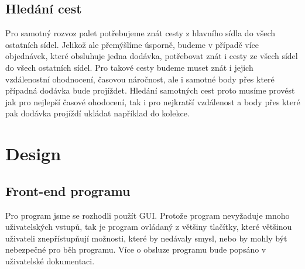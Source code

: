 \documentclass[ 12pt, a4paper]{article}
\begin{document}
\subsection{Hledání cest}
Pro samotný rozvoz palet potřebujeme znát cesty z hlavního sídla do všech ostatních sídel. 
Jelikož ale přemýšlíme úsporně, budeme v případě více objednávek, které obsluhuje jedna dodávka, potřebovat znát i cesty ze všech sídel do všech ostatních sídel.
Pro takové cesty budeme muset znát i jejich vzdálenostní ohodnocení, časovou náročnost, ale i samotné body přes které případná dodávka bude projíždet. 
Hledání samotných cest proto musíme provést jak pro nejlepší časové ohodocení, tak i pro nejkratší vzdálenost a body přes které pak dodávka projíždí ukládat například do kolekce.


\newpage
%
%
\section{Design}
\subsection{Front-end programu}
Pro program jsme se rozhodli použít GUI. Protože program nevyžaduje mnoho uživatelských vstupů, tak je program ovládaný z většiny tlačítky, které většinou uživateli znepřístupňují možnosti, které by nedávaly smysl, nebo by mohly být nebezpečné pro běh programu. Více o obsluze programu bude popsáno v uživatelské dokumentaci.\newline\newline
%
\end{document}
